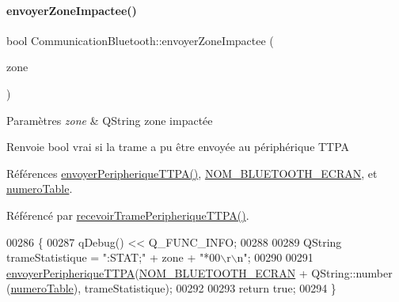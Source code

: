 \paragraph{\texorpdfstring{envoyer\+Zone\+Impactee()}{envoyerZoneImpactee()}}
{\footnotesize\ttfamily bool Communication\+Bluetooth\+::envoyer\+Zone\+Impactee (\begin{DoxyParamCaption}\item[{Q\+String}]{zone }\end{DoxyParamCaption})}


\begin{DoxyParams}{Paramètres}
{\em zone} & Q\+String zone impactée \\
\hline
\end{DoxyParams}
\begin{DoxyReturn}{Renvoie}
bool vrai si la trame a pu être envoyée au périphérique T\+T\+PA 
\end{DoxyReturn}


Références \hyperlink{class_communication_bluetooth_a73d95b841bf64a4463760435a41fc219}{envoyer\+Peripherique\+T\+T\+P\+A()}, \hyperlink{terminal-_t_t_p_a_2communicationbluetooth_8h_a2bd8beaaf0c4b59979a3f78d4c134ec8}{N\+O\+M\+\_\+\+B\+L\+U\+E\+T\+O\+O\+T\+H\+\_\+\+E\+C\+R\+AN}, et \hyperlink{class_communication_bluetooth_a9428f8261f0cc055e9c6fed9a61cb595}{numero\+Table}.



Référencé par \hyperlink{class_communication_bluetooth_ae50bbbf70a5afdea0a0c4d3322e90e40}{recevoir\+Trame\+Peripherique\+T\+T\+P\+A()}.


\begin{DoxyCode}
00286 \{
00287     qDebug() << Q\_FUNC\_INFO;
00288 
00289     QString trameStatistique = \textcolor{stringliteral}{":STAT;"} + zone + \textcolor{stringliteral}{"*00\(\backslash\)r\(\backslash\)n"};
00290 
00291     \hyperlink{class_communication_bluetooth_a73d95b841bf64a4463760435a41fc219}{envoyerPeripheriqueTTPA}(\hyperlink{terminal-_t_t_p_a_2communicationbluetooth_8h_a2bd8beaaf0c4b59979a3f78d4c134ec8}{NOM\_BLUETOOTH\_ECRAN} + QString::number
      (\hyperlink{class_communication_bluetooth_a9428f8261f0cc055e9c6fed9a61cb595}{numeroTable}), trameStatistique);
00292 
00293     \textcolor{keywordflow}{return} \textcolor{keyword}{true};
00294 \}
\end{DoxyCode}
\mbox{\label{class_communication_bluetooth_a90c5c3c42145bad0f80a7a75d98dc253}} 
